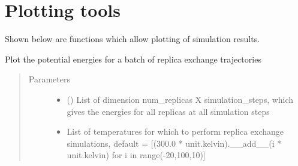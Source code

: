 \documentclass[letterpaper,12pt,english,openany,oneside]{sphinxmanual}
\begin{document}
\section{Plotting tools}
\label{\detokenize{simulation:plotting-tools}}
Shown below are functions which allow plotting of simulation results.

\label{\detokenize{simulation:module-simulation.rep_exch}}

\begin{fulllineitems}
\label{\detokenize{simulation:simulation.rep_exch.plot_replica_exchange_energies}}
Plot the potential energies for a batch of replica exchange trajectories
\begin{quote}\begin{description}
\item[{Parameters}] \leavevmode\begin{itemize}
\item {} 
 (\sphinxstyleliteralemphasis{\sphinxupquote{( }}\sphinxstyleliteralemphasis{\sphinxupquote{( }}\sphinxstyleliteralemphasis{\sphinxupquote{ ) }}\sphinxstyleliteralemphasis{\sphinxupquote{ )}}) \textendash{} List of dimension num\_replicas X simulation\_steps, which gives the energies for all replicas at all simulation steps

\item {} 
 \textendash{} List of temperatures for which to perform replica exchange simulations, default = {[}(300.0 * unit.kelvin).\_\_add\_\_(i * unit.kelvin) for i in range(-20,100,10){]}


\end{itemize}
\end{description}
\end{quote}
\end{fulllineitems}
\end{document}
